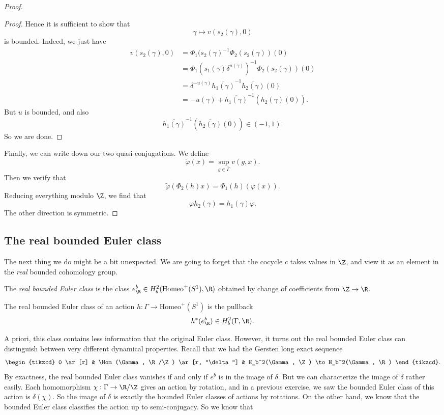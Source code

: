 \documentclass[a4paper]{article}
\newcommand\Homeo{\mathrm{Homeo}}
\begin{document}
\begin{proof}
\begin{proof}
    Hence it is sufficient to show that
    \[
      \gamma \mapsto v(s_2(\gamma), 0)
    \]
    is bounded. Indeed, we just have
    \begin{align*}
      v(s_2(\gamma), 0) &= \Phi_1 (s_2(\gamma)^{-1} \Phi_2(s_2(\gamma))(0)\\
      &= \Phi_1(s_1(\gamma) \delta^{u(\gamma)})^{-1} \Phi_2(s_2(\gamma))(0)\\
      &= \delta^{-u(\gamma)} \overline{h_1(\gamma)}^{-1} \overline{h_2(\gamma)} (0)\\
      &= - u(\gamma) + \overline{h_1(\gamma)}^{-1} (\overline{h_2}(\gamma)(0)).
    \end{align*}
    But $u$ is bounded, and also
    \[
      \overline{h_1(\gamma)}^{-1} (\overline{h_2(\gamma)}(0)) \in (-1, 1).
    \]
    So we are done.
  \end{proof}
  Finally, we can write down our two quasi-conjugations. We define
  \[
    \tilde{\varphi}(x) = \sup_{g \in \bar{\Gamma}} v(g, x).
  \]
  Then we verify that
  \[
    \tilde{\varphi}(\Phi_2(h) x) = \Phi_1(h)(\varphi(x)).
  \]
  Reducing everything modulo $\Z$, we find that
  \[
    \varphi h_2(\gamma) = h_1(\gamma) \varphi.
  \]
  The other direction is symmetric.
\end{proof}

\subsection{The real bounded Euler class}
The next thing we do might be a bit unexpected. We are going to forget that the cocycle $c$ takes values in $\Z$, and view it as an element in the \emph{real} bounded cohomology group.
\begin{defi}
  The \emph{real bounded Euler class} is the class $e_\R^b \in H_b^2(\Homeo^+(S^1), \R)$ obtained by change of coefficients from $\Z \to \R$.

  The real bounded Euler class of an action $h\colon \Gamma \to \Homeo^+(S^1)$ is the pullback
  \[
    h^*(e_\R^b) \in H_b^2(\Gamma, \R).
  \]
\end{defi}

A priori, this class contains less information that the original Euler class. However, it turns out the real bounded Euler class can distinguish between very different dynamical properties. Recall that we had the Gersten long exact sequence
\[
  \begin{tikzcd}
    0 \ar[r] & \Hom(\Gamma, \R/\Z) \ar[r, "\delta"] & H_b^2(\Gamma, \Z) \to H_b^2(\Gamma, \R)
  \end{tikzcd}.
\]
By exactness, the real bounded Euler class vanishes if and only if $e^b$ is in the image of $\delta$. But we can characterize the image of $\delta$ rather easily. Each homomorphism $\chi: \Gamma \to \R/\Z$ gives an action by rotation, and in a previous exercise, we saw the bounded Euler class of this action is $\delta(\chi)$. So the image of $\delta$ is exactly the bounded Euler classes of actions by rotations. On the other hand, we know that the bounded Euler class classifies the action up to semi-conjugacy. So we know that
\end{document}
